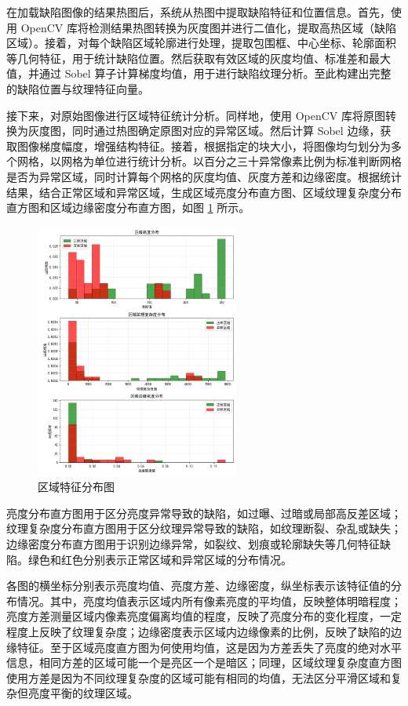 \documentclass[
  ]{njuthesis}
\begin{document}
在加载缺陷图像的结果热图后，系统从热图中提取缺陷特征和位置信息。首先，使用 OpenCV 库将检测结果热图转换为灰度图并进行二值化，提取高热区域（缺陷区域）。接着，对每个缺陷区域轮廓进行处理，提取包围框、中心坐标、轮廓面积等几何特征，用于统计缺陷位置。然后获取有效区域的灰度均值、标准差和最大值，并通过 Sobel 算子计算梯度均值，用于进行缺陷纹理分析。至此构建出完整的缺陷位置与纹理特征向量。

接下来，对原始图像进行区域特征统计分析。同样地，使用 OpenCV 库将原图转换为灰度图，同时通过热图确定原图对应的异常区域。然后计算 Sobel 边缘，获取图像梯度幅度，增强结构特征。接着，根据指定的块大小，将图像均匀划分为多个网格，以网格为单位进行统计分析。以百分之三十异常像素比例为标准判断网格是否为异常区域，同时计算每个网格的灰度均值、灰度方差和边缘密度。根据统计结果，结合正常区域和异常区域，生成区域亮度分布直方图、区域纹理复杂度分布直方图和区域边缘密度分布直方图，如图 \ref{区域特征分布图} 所示。

\begin{figure}[htb]
    \centering
    \includegraphics[width=0.6\textwidth]{images/区域特征分布图.png}
    \caption{区域特征分布图}
    \label{区域特征分布图}
\end{figure}

亮度分布直方图用于区分亮度异常导致的缺陷，如过曝、过暗或局部高反差区域；纹理复杂度分布直方图用于区分纹理异常导致的缺陷，如纹理断裂、杂乱或缺失；边缘密度分布直方图用于识别边缘异常，如裂纹、划痕或轮廓缺失等几何特征缺陷。绿色和红色分别表示正常区域和异常区域的分布情况。

各图的横坐标分别表示亮度均值、亮度方差、边缘密度，纵坐标表示该特征值的分布情况。其中，亮度均值表示区域内所有像素亮度的平均值，反映整体明暗程度；亮度方差测量区域内像素亮度偏离均值的程度，反映了亮度分布的变化程度，一定程度上反映了纹理复杂度；边缘密度表示区域内边缘像素的比例，反映了缺陷的边缘特征。至于区域亮度直方图为何使用均值，这是因为方差丢失了亮度的绝对水平信息，相同方差的区域可能一个是亮区一个是暗区；同理，区域纹理复杂度直方图使用方差是因为不同纹理复杂度的区域可能有相同的均值，无法区分平滑区域和复杂但亮度平衡的纹理区域。
\end{document}

